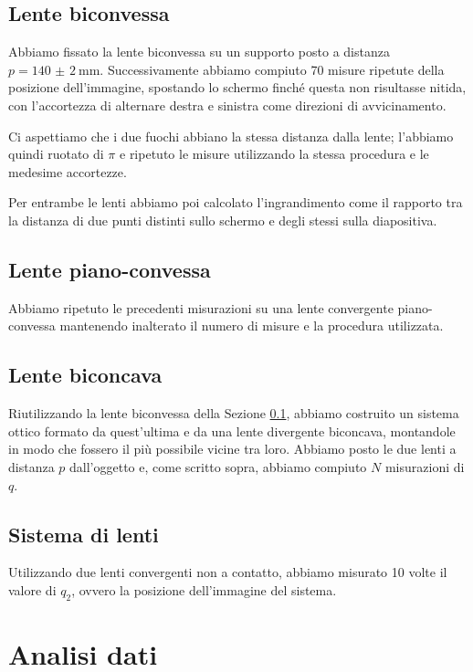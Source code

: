 \documentclass[a4paper]{article}
\begin{document}
    \subsection{Lente biconvessa}\label{sec:biconvessa}
        Abbiamo fissato la lente biconvessa su un supporto posto a distanza $p=\SI{140(2)}{\mm}$. Successivamente abbiamo compiuto 70 misure ripetute della posizione dell'immagine, spostando lo schermo finché questa non risultasse nitida, con l'accortezza di alternare destra e sinistra come direzioni di avvicinamento.

        Ci aspettiamo che i due fuochi abbiano la stessa distanza dalla lente; l'abbiamo quindi ruotato di $\pi$ e ripetuto le misure utilizzando la stessa procedura e le medesime accortezze.

        Per entrambe le lenti abbiamo poi calcolato l'ingrandimento come il rapporto tra la distanza di due punti distinti sullo schermo e degli stessi sulla diapositiva.
        
    \subsection{Lente piano-convessa}    
    Abbiamo ripetuto le precedenti misurazioni su una lente convergente piano-convessa mantenendo inalterato il numero di misure e la procedura utilizzata.
    
    \subsection{Lente biconcava}
    Riutilizzando la lente biconvessa della Sezione \ref{sec:biconvessa}, abbiamo costruito un sistema ottico formato da quest'ultima e da una lente divergente biconcava, montandole in modo che fossero il più possibile vicine tra loro. Abbiamo posto le due lenti a distanza $p$ dall'oggetto e, come scritto sopra, abbiamo compiuto $N$ misurazioni di $q$.
    
    \subsection{Sistema di lenti}
    Utilizzando due lenti convergenti non a contatto, abbiamo misurato 10 volte il valore di $q_2$, ovvero la posizione dell'immagine del sistema.
\section{Analisi dati}
\end{document}
